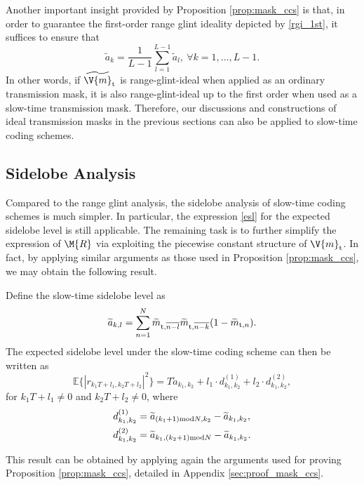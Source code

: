 \documentclass[journal,a4paper,10pt, romanappendices]{IEEEtran}
\begin{document}
Another important insight provided by Proposition \ref{prop:mask_ccs} is that, in order to guarantee the first-order range glint ideality depicted by \eqref{rgi_1st}, it suffices to ensure that
\begin{equation}
\widetilde{a}_k=\frac{1}{L-1}\sum_{l=1}^{L-1}\widetilde{a}_l,~\forall k=1,\dotsc,L-1.
\end{equation}
In other words, if $\widetilde{\V{m}}_{\rm t}$ is range-glint-ideal when applied as an ordinary transmission mask, it is also range-glint-ideal up to the first order when used as a slow-time transmission mask. Therefore, our discussions and constructions of ideal transmission masks in the previous sections can also be applied to slow-time coding schemes.

\subsection{Sidelobe Analysis}
Compared to the range glint analysis, the sidelobe analysis of slow-time coding schemes is much simpler. In particular, the expression \eqref{esl} for the expected sidelobe level is still applicable. The remaining task is to further simplify the expression of $\M{R}$ via exploiting the piecewise constant structure of $\V{m}_{\rm t}$. In fact, by applying similar arguments as those used in Proposition \ref{prop:mask_ccs}, we may obtain the following result. 
\begin{corollary}\label{coro:sidelobe2d_st}
Define the slow-time sidelobe level as
$$
\widetilde{a}_{k,l} = \sum_{n=1}^N \widetilde{m}_{{\rm t},\overline{n-l}} \widetilde{m}_{{\rm t},\overline{n-k}} (1-\widetilde{m}_{{\rm t},n}).
$$
The expected sidelobe level under the slow-time coding scheme can then be written as
\begin{equation}\label{st_esl}
\mathbb{E}\{|r_{k_1T+l_1,k_2T+l_2}|^2\} = T\widetilde{a}_{k_1,k_2} + l_1\cdot d^{(1)}_{k_1,k_2}+ l_2\cdot d^{(2)}_{k_1,k_2},
\end{equation}
for $k_1T+l_1\neq 0$ and $k_2T+l_2\neq 0$, where
$$
\begin{aligned}
d_{k_1,k_2}^{(1)} &= \widetilde{a}_{(k_1+1){\rm mod}N,k_2}- \widetilde{a}_{k_1,k_2}, \\
d_{k_1,k_2}^{(2)} &= \widetilde{a}_{k_1,(k_2+1){\rm mod}N}- \widetilde{a}_{k_1,k_2}.
\end{aligned}
$$
\begin{IEEEproof}
This result can be obtained by applying again the arguments used for proving Proposition \ref{prop:mask_ccs}, detailed in Appendix \ref{sec:proof_mask_ccs}.
\end{IEEEproof}
\end{corollary}
\end{document}
